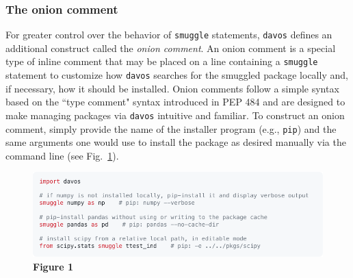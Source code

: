 \documentclass[preprint,12pt, a4paper]{elsarticle}
\begin{document}
\subsubsection{The onion comment}
For greater control over the behavior of \texttt{smuggle} statements, \texttt{davos} defines an additional construct called the \textit{onion comment}. An onion comment is a special type of inline comment that may be placed on a line containing a \texttt{smuggle} statement to customize how \texttt{davos} searches for the smuggled package locally and, if necessary, how it should be installed. Onion comments follow a simple syntax based on the ``type comment" syntax introduced in PEP 484 \cite{vanREtal14} and are designed to make managing packages via \texttt{davos} intuitive and familiar. To construct an onion comment, simply provide the name of the installer program (e.g., \texttt{pip}) and the same arguments one would use to install the package as desired manually via the command line (see Fig.~\ref{fig:snippet1}).

\begin{figure}[h]
\centering
\includegraphics[width=\textwidth]{snippets/snippet1.pdf}
\caption{\small \textbf{Figure 1}}
\label{fig:snippet1}
\end{figure}



%
%
%
%
%
\end{document}
